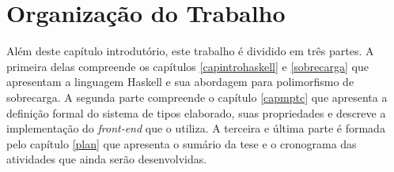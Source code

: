 \section{Organiza\c{c}\~ao do Trabalho}

Al\'em deste cap\'itulo introdut\'orio, este trabalho \'e dividido em tr\^es partes. A primeira delas compreende os 
cap\'itulos \ref{capintrohaskell} e \ref{sobrecarga} que apresentam a linguagem Haskell e sua abordagem para polimorfismo
de sobrecarga. A segunda parte compreende o cap\'itulo \ref{capmptc} que apresenta a defini\c{c}\~ao formal do sistema
de tipos elaborado, suas propriedades e descreve a implementa\c{c}\~ao do \emph{front-end} que o utiliza. A terceira
e \'ultima parte \'e formada pelo cap\'itulo \ref{plan} que apresenta o sum\'ario da tese e o cronograma
das atividades que ainda ser\~ao desenvolvidas. 